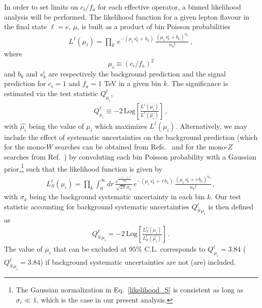 \documentclass[11pt]{article}
\newcommand{\cl}{\%\,\,  \text{C.L.}}
\newcommand{\beq}{\begin{equation}}
\newcommand{\eeq}{\end{equation}}
\renewcommand{\[}{\begin{equation}}
\renewcommand{\]}{\end{equation}}
\begin{document}
In order to set limits on $c_i/f_a$ for each effective operator,  a binned likelihood analysis will be performed. The likelihood function for 
a given lepton flavour in the final state $\ell = e, \,\mu$, 
is built as a product of bin Poisson probabilities
%
\begin{eqnarray}
L^{\ell}(\mu_i) = \prod_k \,e^{-(\mu_i\,s^i_k +\, b_k)}\, \frac{(\mu_i\,s^i_k + b_k)^{n_k}}{n_k !} \,,   
\label{likelihood_NS}
\end{eqnarray}
%
where 
\beq
\mu_i \equiv (c_i/f_a)^2
\label{mui}
\eeq
 and $b_k$ and $s^i_k$ are respectively the background prediction and the signal prediction for $c_i = 1$ and $f_a = 1$ TeV in a given  
bin $k$. The significance is estimated via the test statistic $Q^{\ell}_{\mu_i}$, 
%
\begin{eqnarray}
Q^{\ell}_{\mu_i} \equiv -2\, \mathrm{Log} \left[\frac{L^{\ell}(\mu_i)}{L^{\ell}(\hat{\mu_i})} \right]\,,
\label{likelihood_1}
\end{eqnarray}
%
with $\hat{\mu_i}$ being the value of $\mu_i$ which maximizes $L^{\ell}(\mu_i)$. Alternatively, we may include the effect of systematic uncertainties on 
the background prediction (which for the mono-$W$ searches can be obtained from Refs.~\cite{ATLAS-CONF-2015-063,Aaboud:2016zkn}  and for the mono-$Z$ 
searches from Ref.~\cite{CMS:2016yfc}) by convoluting each bin Poisson probability 
with a Gaussian prior,\footnote{The Gaussian normalization in Eq.~\eqref{likelihood_S} is consistent as long as $\sigma_i \ll 1$, which is the case in our present analysis.} 
such that the likelihood function is given by 
%
\begin{eqnarray}
L^{\ell}_{S}(\mu_i) = \prod_k \int_{0}^{\infty} dr\, \frac{e^{\frac{-(r-1)^2}{2\sigma_k^2}}}{\sqrt{2\pi}\sigma_k}  
\,e^{-(\mu_i\,s^i_k +\, r\, b_k)}\, \frac{(\mu_i\,s^i_k + r\,b_k)^{n_k}}{n_k !}  \,,
\label{likelihood_S}
\end{eqnarray}
%
with $\sigma_k$ being the background systematic uncertainty in each 
bin $k$. Our test statistic accounting for background systematic uncertainties $Q^{\ell}_{S\,\mu_i}$ is then defined as
%
\begin{eqnarray}
Q^{\ell}_{S\,\mu_i} = -2\, \mathrm{Log} \left[\frac{L^{\ell}_S(\mu_i)}{L^{\ell}_S(\hat{\mu_i})} \right]\,.
\label{likelihood_2}
\end{eqnarray}
The value of $\mu_i$ that can be excluded at $95\cl$  
corresponds to 
$Q^{\ell}_{\,\mu_i} = 3.84$ ($Q^{\ell}_{S\,\mu_i} = 3.84$) if background systematic uncertainties are not (are) included.
\end{document}
